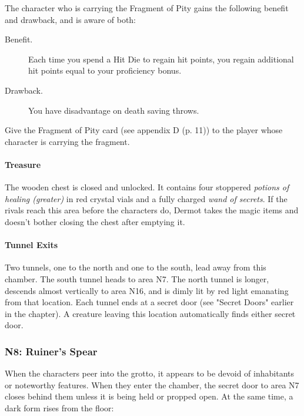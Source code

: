 \documentclass[letterpaper, 11pt, bg=full, twocolumn]{dndbook}
\begin{document}
The character who is carrying the Fragment of Pity gains the following benefit and drawback, and is aware of both:

\begin{DndSidebar}{}
\begin{description}
\item[Benefit.] Each time you spend a Hit Die to regain hit points, you regain additional hit points equal to your proficiency bonus.
\item[Drawback.] You have disadvantage on death saving throws.
\end{description}
\end{DndSidebar}

Give the Fragment of Pity card (see appendix D (p. 11)) to the player whose character is carrying the fragment.

\paragraph{Treasure}

The wooden chest is closed and unlocked. It contains four stoppered \textit{potions of healing (greater)} in red crystal vials and a fully charged \textit{wand of secrets}. If the rivals reach this area before the characters do, Dermot takes the magic items and doesn't bother closing the chest after emptying it.

\paragraph{Tunnel Exits}

Two tunnels, one to the north and one to the south, lead away from this chamber. The south tunnel heads to area N7. The north tunnel is longer, descends almost vertically to area N16, and is dimly lit by red light emanating from that location. Each tunnel ends at a secret door (see "Secret Doors" earlier in the chapter). A creature leaving this location automatically finds either secret door.

\subsubsection{N8: Ruiner's Spear}

When the characters peer into the grotto, it appears to be devoid of inhabitants or noteworthy features. When they enter the chamber, the secret door to area N7 closes behind them unless it is being held or propped open. At the same time, a dark form rises from the floor:
\end{document}
